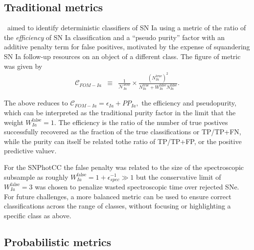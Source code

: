 \subsection{Traditional metrics}
\label{sec:past}


\snphotcc\ aimed to identify deterministic classifiers of SN Ia using a metric of the ratio of the \textit{efficiency} of SN Ia classification and a ``pseudo purity'' factor with an additive penalty term for false positives, motivated by the expense of squandering SN Ia follow-up resources on an object of a different class.
The figure of metric was given by
\begin{eqnarray}
  \label{eq:snphotcc}
  \mathcal{C}_{FOM-Ia} &\equiv& \frac{1}{\mathcal{N}_{Ia}^{TOT}}\times \frac{(N_{Ia}^{\mathrm{true}})^2}{N_{Ia}^\mathrm{true}+W_{Ia}^\mathrm{false}N_{Ia}^\mathrm{false}}.
\end{eqnarray}

The above reduces to $\mathcal{C}_{FOM-Ia}  = \epsilon_{Ia} + PP_{Ia},$ the efficiency and pseudopurity, which can be interpreted as the traditional purity factor in the limit that the weight $W_{Ia}^\mathrm{false} = 1$.
The efficiency is the ratio of the number of true postives successfully recovered as the fraction of the true classifications or TP/TP+FN, while the purity can itself be related tothe ratio of TP/TP+FP, or the positive predictive valuev.

For the SNPhotCC the false penalty was related to the size of the spectroscopic subsample as roughly $W_{Ia}^\mathrm{false} = 1 + \epsilon_{spec}^{-1} \gg 1$ but the conservative limit of $W_{Ia}^\mathrm{false} = 3$ was chosen to penalize wasted spectroscopic time over rejected SNe.
For future challenges, a more balanced metric can be used to ensure correct classifications across the range of classes, without focusing or highlighting a specific class as above.


\subsection{Probabilistic metrics}
\label{sec:metrics}

